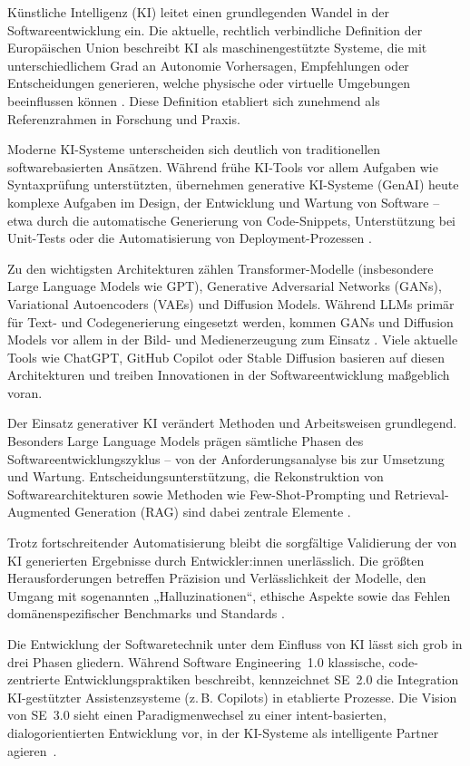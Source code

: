 
Künstliche Intelligenz (KI) leitet einen grundlegenden Wandel in der
Softwareentwicklung ein. Die aktuelle, rechtlich verbindliche Definition der
Europäischen Union beschreibt KI als maschinengestützte Systeme, die mit
unterschiedlichem Grad an Autonomie Vorhersagen, Empfehlungen oder
Entscheidungen generieren, welche physische oder virtuelle Umgebungen
beeinflussen können \cite{noauthor_verordnung_nodate}. Diese Definition
etabliert sich zunehmend als Referenzrahmen in Forschung und Praxis.

Moderne KI-Systeme unterscheiden sich deutlich von traditionellen
softwarebasierten Ansätzen. Während frühe KI-Tools vor allem Aufgaben wie
Syntaxprüfung unterstützten, übernehmen generative KI-Systeme (GenAI) heute
komplexe Aufgaben im Design, der Entwicklung und Wartung von Software – etwa
durch die automatische Generierung von Code-Snippets, Unterstützung bei
Unit-Tests oder die Automatisierung von Deployment-Prozessen
\cite{donvir_role_2024}.

Zu den wichtigsten Architekturen zählen Transformer-Modelle (insbesondere Large
Language Models wie GPT), Generative Adversarial Networks (GANs), Variational
Autoencoders (VAEs) und Diffusion Models. Während LLMs primär für Text- und
Codegenerierung eingesetzt werden, kommen GANs und Diffusion Models vor allem
in der Bild- und Medienerzeugung zum Einsatz \cite{donvir_role_2024}. Viele
aktuelle Tools wie ChatGPT, GitHub Copilot oder Stable Diffusion basieren auf
diesen Architekturen und treiben Innovationen in der Softwareentwicklung
maßgeblich voran.

Der Einsatz generativer KI verändert Methoden und Arbeitsweisen grundlegend.
Besonders Large Language Models prägen sämtliche Phasen des
Softwareentwicklungszyklus – von der Anforderungsanalyse bis zur Umsetzung und
Wartung. Entscheidungsunterstützung, die Rekonstruktion von
Softwarearchitekturen sowie Methoden wie Few-Shot-Prompting und
Retrieval-Augmented Generation (RAG) sind dabei zentrale Elemente
\cite{esposito_generative_2025}.

Trotz fortschreitender Automatisierung bleibt die sorgfältige Validierung der
von KI generierten Ergebnisse durch Entwickler:innen unerlässlich. Die größten
Herausforderungen betreffen Präzision und Verlässlichkeit der Modelle, den
Umgang mit sogenannten „Halluzinationen“, ethische Aspekte sowie das Fehlen
domänenspezifischer Benchmarks und Standards \cite{esposito_generative_2025}.

Die Entwicklung der Softwaretechnik unter dem Einfluss von KI lässt sich grob
in drei Phasen gliedern. Während Software Engineering~1.0 klassische,
code-zentrierte Entwicklungspraktiken beschreibt, kennzeichnet SE~2.0 die
Integration KI-gestützter Assistenzsysteme (z.\,B. Copilots) in etablierte
Prozesse. Die Vision von SE~3.0 sieht einen Paradigmenwechsel zu einer
intent-basierten, dialogorientierten Entwicklung vor, in der KI-Systeme als
intelligente Partner agieren~\cite{hassan_towards_2024}.

